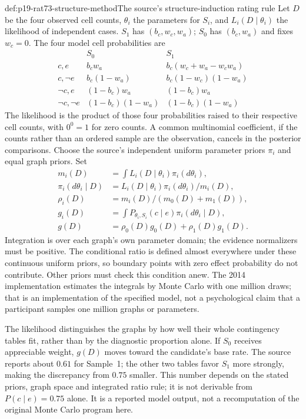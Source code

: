 \begin{hbmethod}{def:p19-rat73-structure-method}{The source's structure-induction rating rule}
Let \(D\) be the four observed cell counts, \(\theta_i\) the
parameters for \(S_i\), and \(L_i(D\mid\theta_i)\) the likelihood
of independent cases. \(S_1\) has \((b_c,w_c,w_a)\);
\(S_0\) has \((b_c,w_a)\) and fixes \(w_c=0\).
The four model cell probabilities are
\[
\begin{array}{c|cc}
 &S_0&S_1\\\hline
 c,e&b_cw_a&b_c(w_c+w_a-w_cw_a)\\
 c,\neg e&b_c(1-w_a)&b_c(1-w_c)(1-w_a)\\
 \neg c,e&(1-b_c)w_a&(1-b_c)w_a\\
 \neg c,\neg e&(1-b_c)(1-w_a)&(1-b_c)(1-w_a)
\end{array}
\]
The likelihood is the product of those four probabilities raised to
their respective cell counts, with \(0^0=1\) for zero counts.
A common multinomial coefficient, if the counts rather than an ordered
sample are the observation, cancels in the posterior comparisons.
Choose the source's independent uniform parameter priors
\(\pi_i\) and equal graph priors. Set
\[
\begin{split}
 m_i(D)&=\int L_i(D\mid\theta_i)\pi_i(d\theta_i),\\
 \pi_i(d\theta_i\mid D)&=
       L_i(D\mid\theta_i)\pi_i(d\theta_i)/m_i(D),\\
 \rho_i(D)&=m_i(D)/(m_0(D)+m_1(D)),\\
 g_i(D)&=\int P_{\theta_i,S_i}(c\mid e)
                         \pi_i(d\theta_i\mid D),\\
 g(D)&=\rho_0(D)g_0(D)+\rho_1(D)g_1(D).
\end{split}
\]
Integration is over each graph's own parameter domain; the evidence
normalizers must be positive. The conditional ratio is defined almost
everywhere under these continuous uniform priors, so boundary points with
zero effect probability do not contribute. Other priors must check this
condition anew. The 2014 implementation estimates the integrals by
Monte Carlo with one million draws; that is an implementation of the
specified model, not a psychological claim that a participant samples
one million graphs or parameters.
\cite[Appendix~A, pp.~299--300]{MederMayrhoferWaldmann2014StructureInduction}
\end{hbmethod}

The likelihood distinguishes the graphs by how well their whole contingency
tables fit, rather than by the diagnostic proportion alone. If \(S_0\)
receives appreciable weight, \(g(D)\) moves toward the candidate's base
rate. The source reports about \(0.61\) for Sample~1; the other two
tables favor \(S_1\) more strongly, making the discrepancy from \(0.75\)
smaller. This number depends on the stated priors, graph space and
integrated ratio rule; it is not derivable from \(P(c\mid e)=0.75\)
alone. It is a reported model output, not a recomputation of the original
Monte Carlo program here.
\cite[fig.~7.3.1 and sec.~2.3, pp.~450--452]{MederMayrhofer2021DiagnosticCausal}


